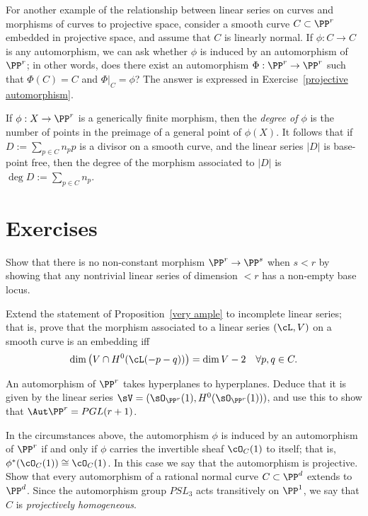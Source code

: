 For another example of the relationship between linear series on curves and morphisms of curves to projective space, consider a smooth curve $C \subset \PP^r$ embedded in projective space, and assume that $C$ is linearly normal. If $\phi : C \to C$ is any automorphism, we can ask whether $\phi$ is induced by an automorphism of $\PP^r$; in other words, does there exist an automorphism $\Phi : \PP^r \to \PP^r$ such that $\Phi(C) = C$ and $\Phi|_C = \phi$? The answer is expressed in Exercise~\ref{projective automorphism}.


If $\phi:X \to \PP^r$ is a generically finite morphism, then the \emph{degree of $\phi$} is the number of points in the preimage of a general point of $\phi(X)$. It follows that if $D := \sum_{p\in C} n_pp$ is a divisor on a smooth curve, and the linear series $|D|$ is base-point free, then the degree of the morphism associated to $|D|$ is $\deg D := \sum_{p\in C} n_p$.

\section{Exercises}

\begin{exercise}\label{here there be basepoints}
 Show that there is no non-constant morphism $\PP^r\to \PP^s$ when $s<r$ by showing that any nontrivial linear
 series of dimension $<r$ has a non-empty base locus.
\end{exercise}

\begin{exercise}
Extend the statement of Proposition~\ref{very ample} to incomplete linear series; that is, prove that the morphism associated to a linear series $(\cL, V)$
on a smooth curve is an embedding iff
$$
\dim\big( V \cap H^0(\cL(-p-q))\big) = \dim V - 2 \quad \forall p, q \in C.
$$
\end{exercise}

\begin{exercise}\label{aut Pr}
An automorphism of $\PP^r$ takes hyperplanes to hyperplanes. Deduce that it is given by the linear series
$\sV = (\sO_{\PP^r}(1), H^0(\sO_{\PP^r}(1)))$, and use this to show that $\Aut \PP^r = PGL(r+1)$. 
\end{exercise}

\begin{exercise}\label{projective automorphism}
In the circumstances above, the automorphism $\phi$ is induced by an automorphism of $\PP^r$ if and only if $\phi$ carries the invertible sheaf $\cO_{C}(1)$ to itself; that is, $\phi^*(\cO_{C}(1)) \cong \cO_{C}(1)$. In this case we say that the automorphism
is projective. Show that every automorphism of a rational normal curve $C \subset \PP^d$  extends to $\PP^d$. Since the
automorphism group $PSL_3$ acts transitively on $\PP^1$, we say that
$C$ is \emph{projectively homogeneous}.


\end{exercise}

